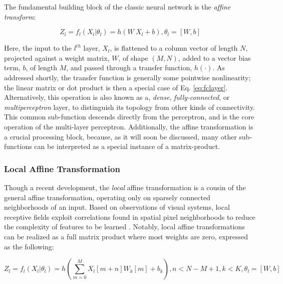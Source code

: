 The fundamental building block of the classic neural network is the \emph{affine transform}:

\begin{equation}
\label{eq:fclayer}
Z_l = f_l(X_l \vert \theta_l) = h( W~X_{l} + b), \theta_l = [W, b]
\end{equation}

\noindent Here, the input to the $l^{th}$ layer, $X_l$, is flattened to a column vector of length $N$, projected against a weight matrix, $W$, of shape $(M, N)$, added to a vector bias term, $b$, of length $M$, and passed through a transfer function, $h(\cdot)$.
As addressed shortly, the transfer function is generally some pointwise nonlinearity;
the linear matrix or dot product is then a special case of Eq. \ref{eq:fclayer}.
Alternatively, this operation is also known as a, \emph{dense}, \emph{fully-connected}, or \emph{multiperceptron} layer, to distinguish its topology from other kinds of connectivity.
This common sub-function descends directly from the perceptron, and is the core operation of the multi-layer perceptron.
Additionally, the affine transformation is a crucial processing block, because, as it will soon be discussed, many other sub-functions can be interpreted as a special instance of a matrix-product.


\subsubsection{Local Affine Transformation}

Though a recent development, the \emph{local} affine transformation is a cousin of the general affine transformation, operating only on sparsely connected neighborhoods of an input.
Based on observations of visual systems, local receptive fields exploit correlations found in spatial pixel neighborhoods to reduce the complexity of features to be learned \cite{Le2010Tiled}.
Notably, local affine transformations can be realized as a full matrix product where most weights are zero, expressed as the following:

\begin{equation}
\label{eq:fclayer}
Z_l = f_l(X_l \vert \theta_l) = h(\sum_{m=0}^{M} X_l[m + n]W_k[m] + b_k), n < N-M+1, k < K, \theta_l = [W, b]
\end{equation}

